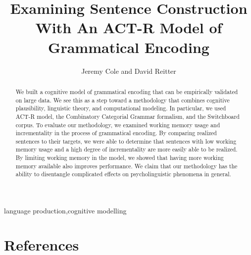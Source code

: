 \documentclass[review]{elsarticle}
\begin{document}
\begin{frontmatter}

\title{Examining Sentence Construction With An ACT-R Model of Grammatical Encoding}

\author{Jeremy Cole and David Reitter} %
\address{College of Information Science and Technology}
\address{The Pennsylvania State University}


\address{University Park, Pennsylvania}

\begin{abstract}
We built a cognitive model of grammatical encoding that can be empirically validated on large data. We see this as a step toward a methodology that combines cognitive plausibility, linguistic theory, and computational modeling. In particular, we used ACT-R model, the Combinatory Categorial Grammar formalism, and the Switchboard corpus. To evaluate our methodology, we examined working memory usage and incrementality in the process of grammatical encoding. By comparing realized sentences to their targets, we were able to determine that sentences with low working memory usage and a high degree of incrementality are more easily able to be realized. By limiting working memory in the model, we showed that having more working memory available also improves performance. We claim that our methodology has the ability to disentangle complicated effects on psycholinguistic phenomena in general.
\end{abstract}

\begin{keyword}
language production\sep cognitive modelling
\end{keyword}

\end{frontmatter}

\linenumbers





%
%
%
%





%
%
%
%

\section*{References}

\end{document}
